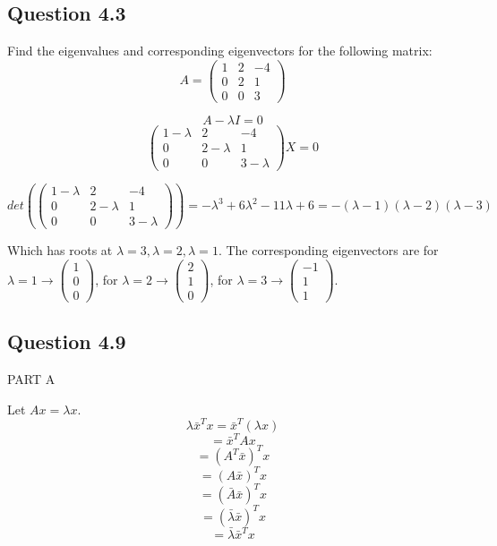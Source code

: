 \documentclass[12pt,a4paper]{report}
\begin{document}
\subsection*{Question 4.3}
Find the eigenvalues and corresponding eigenvectors for the following matrix:
$$A = \left( \begin{smallmatrix}
1&2&-4\\
0&2&1\\
0&0&3
\end{smallmatrix} \right)
$$

$$A - \lambda I = 0 $$
$$\left( \begin{smallmatrix}
1-\lambda&2&-4\\
0&2-\lambda&1\\
0&0&3-\lambda
\end{smallmatrix} \right) X = 0
$$

$$
det(\left( \begin{smallmatrix}
1-\lambda&2&-4\\
0&2-\lambda&1\\
0&0&3-\lambda
\end{smallmatrix} \right) ) = -\lambda^3 + 6 \lambda^2 - 11 \lambda + 6 = -(\lambda - 1)(\lambda -2)(\lambda -3)
$$

Which has roots at $\lambda = 3, \lambda = 2, \lambda = 1$.
The corresponding eigenvectors are
for $\lambda = 1 \rightarrow \left(\begin{smallmatrix}1\\0\\0\end{smallmatrix}\right)$,
for $\lambda = 2 \rightarrow \left(\begin{smallmatrix}2\\1\\0\end{smallmatrix}\right)$,
for $\lambda = 3 \rightarrow \left(\begin{smallmatrix}-1\\1\\1\end{smallmatrix}\right)$.


\subsection*{Question 4.9}
PART A


Let $Ax = \lambda x$.
$$\lambda \bar{x}^T x = \bar{x}^T(\lambda x)$$
$$= \bar{x}^T A x$$
$$=(A^T \bar{x})^Tx$$
$$=(A \bar{x})^Tx$$
$$=(\bar{A}\bar{x})^T x$$
$$=(\bar{\lambda}\bar{x})^T x$$
$$=\bar{\lambda}\bar{x}^Tx$$
\end{document}
